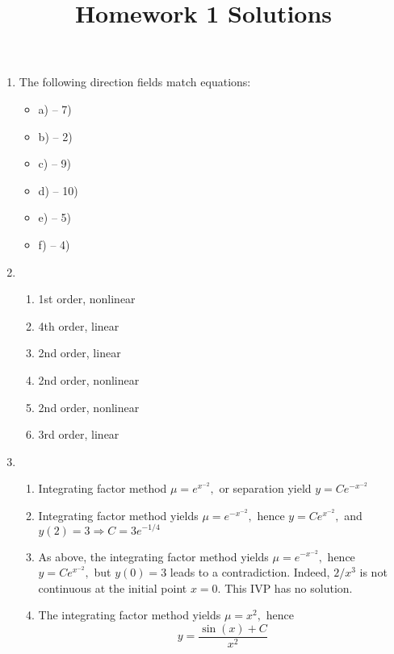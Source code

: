\documentclass[10pt,a4paper]{article}
\title{Homework 1 Solutions}
\date{}
\begin{document}
\maketitle

\begin{enumerate}
\item The following direction fields match equations:
\begin{itemize}
\item a) -- 7)
\item b) -- 2)
\item c) -- 9)
\item d) -- 10)
\item e) -- 5)
\item f) -- 4)
\end{itemize}
\item 
\begin{enumerate}
\item 1st order, nonlinear
\item 4th order, linear
\item 2nd order, linear
\item 2nd order, nonlinear
\item 2nd order, nonlinear
\item 3rd order, linear
\end{enumerate}
\item 
\begin{enumerate}
\item Integrating factor method $\mu = e^{x^{-2}},$ or separation yield $y = C e^{-x^{-2}}$
\item Integrating factor method yields $\mu = e^{-x^{-2}},$ hence $y = C e^{x^{-2}},$ and $y(2) = 3 \Rightarrow C = 3e^{-1/4}$
\item As above, the integrating factor method yields $\mu = e^{-x^{-2}},$ hence $y = C e^{x^{-2}},$ but $y(0) = 3$ leads to a contradiction. Indeed, $2/x^3$ is not continuous at the initial point $x = 0.$ This IVP has no solution.
\item The integrating factor method yields $\mu = x^2,$ hence
\[ y = \frac{\sin(x) + C}{x^2} \]
\end{enumerate}
\end{enumerate}
\end{document}
